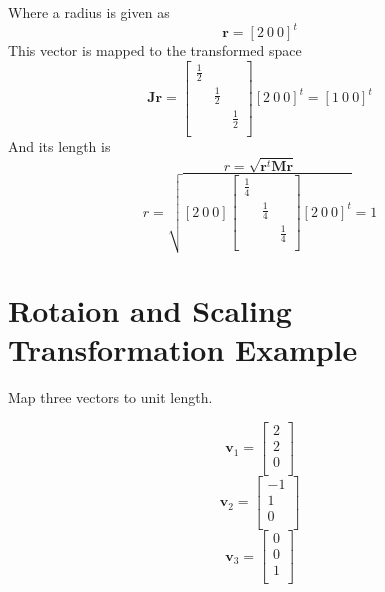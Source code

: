 \documentclass{article}
\begin{document}
Where a radius is given as
\begin{equation}
 \mathbf{r}=\left[2~0~0\right]^t
\end{equation}
This vector is mapped to the transformed space
\begin{equation}
 \mathbf{J}\mathbf{r}=\left[
 \begin{array}{ccc}
   \frac{1}{2}&&\\
   &\frac{1}{2}&\\
   &&\frac{1}{2}\\
 \end{array}\right]\left[2~0~0\right]^t=\left[1~0~0\right]^t
\end{equation}
And its length is
\begin{equation}
 r=\sqrt{\mathbf{r}^t\mathbf{M}\mathbf{r}}
\end{equation}
\begin{equation}
 r=\sqrt{\left[2~0~0\right]\left[
 \begin{array}{ccc}
   \frac{1}{4}&&\\
   &\frac{1}{4}&\\
   &&\frac{1}{4}\\
 \end{array}\right]\left[2~0~0\right]^t}=1
\end{equation}

\section{Rotaion and Scaling Transformation Example}

Map three vectors to unit length.

\begin{equation}
 \mathbf{v}_1=\left[
 \begin{array}{c}
   2\\
   2\\
   0\\
 \end{array}\right]
\end{equation}
\begin{equation}
 \mathbf{v}_2=\left[
 \begin{array}{c}
   -1\\
   1\\
   0\\
 \end{array}\right]
\end{equation}
\begin{equation}
 \mathbf{v}_3=\left[
 \begin{array}{c}
   0\\
   0\\
   1\\
 \end{array}\right]
\end{equation}
 
\end{document}
